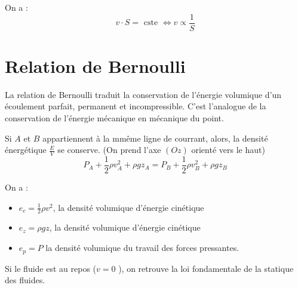 \begin{corollary}[Conséquence]\label{col:propSV}
    On a : 
    \[
        v \cdot S = \text{ cste } \iff v \propto \frac{1}{S}
    \]
\end{corollary}

\section{Relation de Bernoulli}

\begin{definition}\label{def:relbern}
    La relation de Bernoulli traduit la conservation de l'énergie volumique d'un écoulement parfait, permanent et incompressible. C'est l'analogue de la conservation de l'énergie mécanique en mécanique du point.
\end{definition}

\begin{theorem}\label{thm:relbern}
    Si \(A\) et \(B\) appartiennent à la mmême ligne de courrant, alors, la densité énergétique \(\frac{E}{V}\) se conserve. (On prend l'axe \((Oz)\) orienté vers le haut)
    \[
        P_{A} + \frac{1}{2} \rho v_{A}^{2} + \rho g z_{A} = P_{B} + \frac{1}{2} \rho  v_{B}^{2} + \rho g z_{B}
    \] 
\end{theorem}

\begin{definition}\label{def:efluide}
    On a :\\
    \begin{itemize}
        \item \(e_{c} = \frac{1}{2} \rho v^{2}\), la densité volumique d'énergie cinétique
        \item \(e_{z} = \rho g z\), la densité volumique d'énergie cinétique
        \item \(e_{p} = P\) la densité volumique du travail des forces pressantes. 
    \end{itemize}
\end{definition}

\begin{remark}
    Si le fluide est au repos (\(v = 0\) ), on retrouve la loi fondamentale de la statique des fluides.
\end{remark}